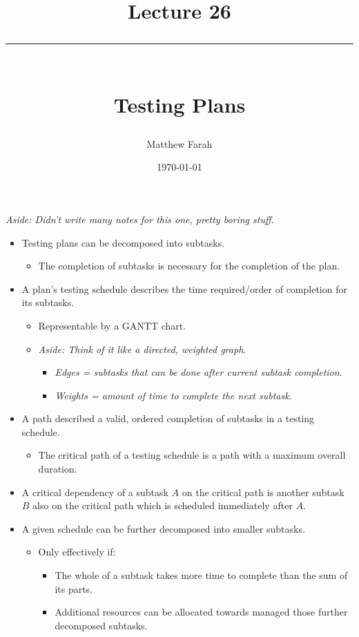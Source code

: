 \documentclass{article}
\date{
	\vspace{-.75em}
	{\large \today}
}
\title{
	\vspace*{-1.5em}
	{\Huge Lecture 26} \\
	\vspace{-1em}
	\rule{\textwidth/4}{.01em} \\
	\vspace{-.25em}
	{\Large Testing Plans}
	\vspace{-.75em}
}
\author{
	{\large Matthew Farah}
}
\begin{document}
\maketitle
\pagestyle{fancy}

\fi

\emph{Aside: Didn't write many notes for this one, pretty boring stuff}. \\

\begin{itemize}
	\item Testing plans can be decomposed into subtasks.
	\begin{itemize}
		\item The completion of subtasks is necessary for the completion of the plan.
	\end{itemize}
	\item A plan's testing schedule describes the time required/order of completion for its subtasks.
	\begin{itemize}
		\item Representable by a GANTT chart.
		\item \emph{Aside: Think of it like a directed, weighted graph}.
		\begin{itemize}
			\item \emph{Edges = subtasks that can be done after current subtask completion}.
			\item \emph{Weights = amount of time to complete the next subtask}.
		\end{itemize}
	\end{itemize}
	\item A path described a valid, ordered completion of subtasks in a testing schedule.
	\begin{itemize}
		\item The critical path of a testing schedule is a path with a maximum overall duration.
	\end{itemize}
	\item A critical dependency of a subtask $A$ on the critical path is another subtask $B$ also on the critical path which is scheduled immediately after $A$.
	\item A given schedule can be further decomposed into smaller subtasks.
	\begin{itemize}
		\item Only effectively if:
		\begin{itemize}
			\item The whole of a subtask takes more time to complete than the sum of its parts.
			\item Additional resources can be allocated towards managed those further decomposed subtasks.
		\end{itemize}
	\end{itemize}
\end{itemize}

\ifdefined\iscombined
	\newpage
\else
	
\end{document}
